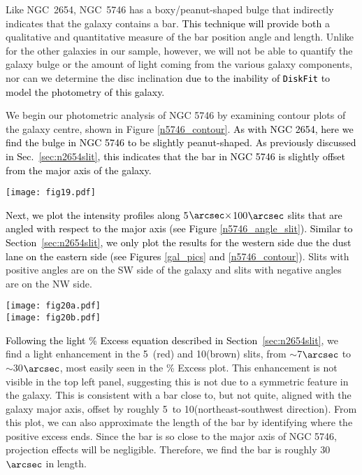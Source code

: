 \documentclass[a4paper,fleqn,usenatbib]{mnras}
\newcommand{\authorfix}{\textcolor{black}}
\begin{document}
Like NGC~2654, NGC~5746 has a boxy/peanut-shaped bulge that indirectly indicates that the galaxy contains a bar.  \authorfix{This technique will provide both} a qualitative and quantitative measure of the bar position angle and length. Unlike for the other galaxies in our sample, however, we will not be able to quantify the galaxy bulge or the amount of light coming from the various galaxy components, nor can we determine the disc inclination \authorfix{due to the inability of \texttt{DiskFit} to model the photometry of this galaxy.} 

We begin our photometric analysis of NGC 5746 by examining contour plots of the galaxy centre, shown in Figure \ref{n5746_contour}. \authorfix{As with NGC 2654, here we find the bulge in NGC 5746 to be slightly peanut-shaped. As previously discussed in Sec.~\ref{sec:n2654slit}, this indicates that the bar in NGC 5746 is slightly offset from the major axis of the galaxy.}

\begin{figure*}
	\texttt{[image: fig19.pdf]}\\
	\caption{Contours of the centre of NGC 5746 in each of the four bands. The contour levels are at similar relative levels for each band. From these plots, the bulge of NGC 5746 is slightly peanut-shaped, most clearly seen as the pinch in the isophotes as they cross the minor axis. There is significant dust along the eastern side of the galaxy.}
	\label{n5746_contour}
\end{figure*}

\authorfix{Next, we plot the intensity profiles along 5$\arcsec \times$100$\arcsec$ slits that are angled with respect to the major axis (see Figure \ref{n5746_angle_slit}). Similar to Section~\ref{sec:n2654slit}, we only plot the results for the western side due the dust lane on the eastern side (see Figures \ref{gal_pics} and \ref{n5746_contour})}. Slits with positive angles are on the SW side of the galaxy and slits with negative angles are on the NW side.

\begin{figure*}
	\centering
	\texttt{[image: fig20a.pdf]} \\
	\texttt{[image: fig20b.pdf]}
	\caption{Angled slit photometry for NGC 5746. Same colours and format as Fig.~\ref{n2654_angle_slit}}
	\label{n5746_angle_slit}
\end{figure*}

\authorfix{Following the light \% Excess equation described in Section~\ref{sec:n2654slit}}, we find a light enhancement in the 5\degr\ (red) and 10\degr (brown) slits, from $\sim$7$\arcsec$ to $\sim$30$\arcsec$, most easily seen in the \% Excess plot. This enhancement is not visible in the top left panel, suggesting this is not due to a symmetric feature in the galaxy. This is consistent with a bar close to, but not quite, aligned with the galaxy major axis, offset by roughly 5\degr\ to 10\degr (northeast-southwest direction). From this plot, we can also approximate the length of the bar by identifying where the positive excess ends. Since the bar is so close to the major axis of NGC 5746, projection effects will be negligible. Therefore, we find the bar is roughly 30$\arcsec$ in length.
\end{document}
